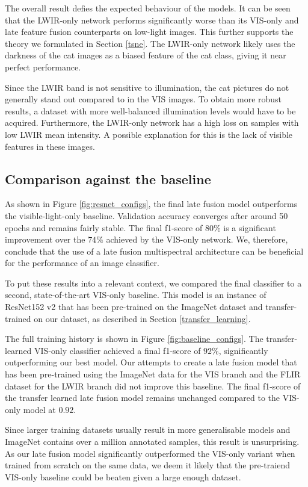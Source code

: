 \documentclass{l4proj}
\begin{document}
The overall result defies the expected behaviour of the models. It can be seen that the LWIR-only network performs significantly worse than its VIS-only and late feature fusion counterparts on low-light images. This further supports the theory we formulated in Section \ref{tsne}. The LWIR-only network likely uses the darkness of the cat images as a biased feature of the cat class, giving it near perfect performance.

Since the LWIR band is not sensitive to illumination, the cat pictures do not generally stand out compared to in the VIS images. To obtain more robust results, a dataset with more well-balanced illumination levels would have to be acquired. Furthermore, the LWIR-only network has a high loss on samples with low LWIR mean intensity. A possible explanation for this is the lack of visible features in these images. 

\subsection{Comparison against the baseline}

As shown in Figure \ref{fig:resnet_configs}, the final late fusion model outperforms the visible-light-only baseline. Validation accuracy converges after around 50 epochs and remains fairly stable. The final f1-score of $80\%$ is a significant improvement over the $74\%$ achieved by the VIS-only network. We, therefore, conclude that the use of a late fusion multispectral architecture can be beneficial for the performance of an image classifier.

To put these results into a relevant context, we compared the final classifier to a second, state-of-the-art VIS-only baseline. This model is an instance of ResNet152 v2 that has been pre-trained on the ImageNet dataset and transfer-trained on our dataset, as described in Section \ref{transfer_learning}.

The full training history is shown in Figure \ref{fig:baseline_configs}. The transfer-learned VIS-only classifier achieved a final f1-score of $92\%$, significantly outperforming our best model. Our attempts to create a late fusion model that has been pre-trained using the ImageNet data for the VIS branch and the FLIR dataset for the LWIR branch did not improve this baseline. The final f1-score of the transfer learned late fusion model remains unchanged compared to the VIS-only model at $0.92$.

Since larger training datasets usually result in more generalisable models and ImageNet contains over a million annotated samples, this result is unsurprising. As our late fusion model significantly outperformed the VIS-only variant when trained from scratch on the same data, we deem it likely that the pre-traiend VIS-only baseline could be beaten given a large enough dataset.
\end{document}
